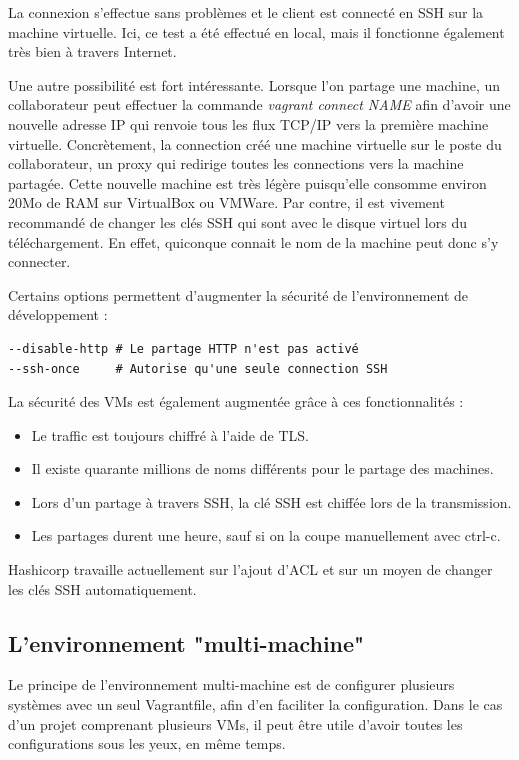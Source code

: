 \documentclass[12pt,a4paper]{article}
\begin{document}
La connexion s'effectue sans problèmes et le client est connecté en SSH sur la machine virtuelle. Ici, ce test a été effectué en local, mais il fonctionne également très bien à travers Internet.

Une autre possibilité est fort intéressante. Lorsque l'on partage une machine, un collaborateur peut effectuer la commande \textit{vagrant connect NAME} afin d'avoir une nouvelle adresse IP qui renvoie tous les flux TCP/IP vers la première machine virtuelle. Concrètement, la connection créé une machine virtuelle sur le poste du collaborateur, un proxy qui redirige toutes les connections vers la machine partagée. Cette nouvelle machine est très légère puisqu'elle consomme environ 20Mo de RAM sur VirtualBox ou VMWare. Par contre, il est vivement recommandé de changer les clés SSH qui sont avec le disque virtuel lors du téléchargement. En effet, quiconque connait le nom de la machine peut donc s'y connecter. 

Certains options permettent d'augmenter la sécurité de l'environnement de développement :
\begin{lstlisting}
--disable-http # Le partage HTTP n'est pas activé
--ssh-once     # Autorise qu'une seule connection SSH
\end{lstlisting}
La sécurité des VMs est également augmentée grâce à ces fonctionnalités :
\begin{itemize}
	\item{Le traffic est toujours chiffré à l'aide de TLS.}
	\item{Il existe quarante millions de noms différents pour le partage des machines.}
	\item{Lors d'un partage à travers SSH, la clé SSH est chiffée lors de la transmission.}
	\item{Les partages durent une heure, sauf si on la coupe manuellement avec ctrl-c.}
\end{itemize}

Hashicorp travaille actuellement sur l'ajout d'ACL et sur un moyen de changer les clés SSH automatiquement.	

\subsection{L'environnement "multi-machine"}
Le principe de l'environnement multi-machine est de configurer plusieurs systèmes avec un seul Vagrantfile, afin d'en faciliter la configuration. Dans le cas d'un projet comprenant plusieurs VMs, il peut être utile d'avoir toutes les configurations sous les yeux, en même temps.
\end{document}
